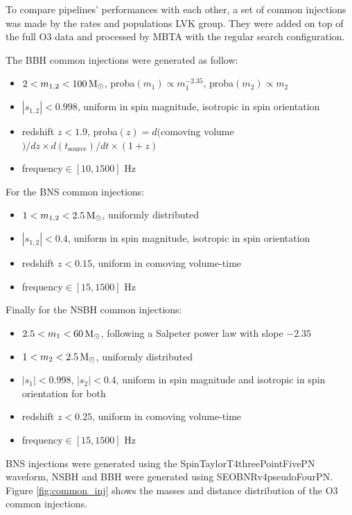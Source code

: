 To compare pipelines' performances with each other, a set of common injections was made by the rates and populations LVK group.
They were added on top of the full O3 data and processed by MBTA with the regular search configuration.

The BBH common injections were generated as follow:
\begin{itemize}
\item $2<m_{1,2}< \SI{100}{\textrm{M$_{\odot}$}}$, proba$(m_1) \propto m_1^{-2.35}$, proba$(m_2) \propto m_2$
\item $|s_{1,2}|<0.998$, uniform in spin magnitude, isotropic in spin orientation
\item redshift $z<1.9$, proba$(z) = d($comoving volume$)/dz \times d(t_{\text{source}})/dt \times (1+z)$
\item frequency$\in [10,1500]$ Hz
\end{itemize}
\vspace{0.2cm}
%
For the BNS common injections:
\begin{itemize}
\item $1<m_{1,2}<\SI{2.5}{\textrm{M$_{\odot}$}}$, uniformly distributed
\item $|s_{1,2}|<0.4$, uniform in spin magnitude, isotropic in spin orientation
\item redshift $z<0.15$, uniform in comoving volume-time
\item frequency$\in [15,1500]$ Hz
\end{itemize}
\vspace{0.2cm}
%
Finally for the NSBH common injections:
\begin{itemize}
\item $2.5<m_{1}<\SI{60}{\textrm{M$_{\odot}$}}$, following a Salpeter power law with slope $-2.35$
\item $1<m_{2}<\SI{2.5}{\textrm{M$_{\odot}$}}$, uniformly distributed
\item $|s_{1}|<0.998$, $|s_{2}|<0.4$, uniform in spin magnitude and isotropic in spin orientation for both
\item redshift $z<0.25$, uniform in comoving volume-time
\item frequency$\in [15,1500]$ Hz
\end{itemize}

BNS injections were generated using the SpinTaylorT4threePointFivePN waveform, NSBH and BBH were generated using SEOBNRv4pseudoFourPN.
Figure \ref{fig:common_inj} shows the masses and distance distribution of the O3 common injections.


